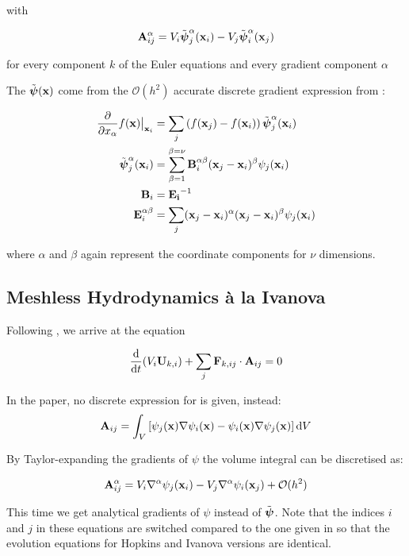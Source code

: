 with

\begin{equation}
	\mathbf{A}_{ij}^\alpha = V_i \tilde{\boldsymbol{\psi}}_j^\alpha (\mathbf{x}_i) - V_j\tilde{\boldsymbol{\psi}}_i^\alpha (\mathbf{x}_j) 			\label{Hopkins}
\end{equation}

for every component $k$ of the Euler equations and every gradient component $\alpha$

The $\tilde{\boldsymbol{\psi}}(\mathbf{x})$ come from the $\mathcal{O}(h^2)$ accurate discrete gradient expression from \cite{lansonRenormalizedMeshfreeSchemes2008}:

\begin{align}
	\frac{\del}{\del x_{\alpha}} f(\x) \big{|}_{\x_i} &= 
	\sum_j \left( f(\x_j) - f(\x_i) \right) \psitilde_j^\alpha (\x_i) 	\\		\label{gradient}
	\psitilde_j^\alpha (\x_i) &= \sum_{\beta = 1}^{\beta=\nu} \mathbf{B}_i^{\alpha \beta} 
	(\x_j - \x_i)^\beta \psi_j(\x_i) 	\\
	\mathbf{B}_i &= \mathbf{E_i} ^ {-1} \\ 
	\mathbf{E}_i^{\alpha \beta} &= \sum_j (\x_j - \x_i)^\alpha (\x_j - \x_i)^\beta \psi_j(\x_i)
\end{align}



where $\alpha$ and $\beta$ again represent the coordinate components for $\nu$ dimensions.












\subsection{Meshless Hydrodynamics \`a la Ivanova}



Following \cite{ivanovaCommonEnvelopeEvolution2013}, we arrive at the equation

\begin{equation}
    \frac{\D}{\D t} (V_i \U_{k,i}) + \sum_j \F_{k,ij} \cdot \Aijm = 0
\end{equation}


In the paper, no discrete expression for \Aij is given, instead:
\begin{equation}
    \mathbf{A}_{ij} = \int_V \left[ \psi_j(\mathbf{x}) \nabla \psi_i(\mathbf{x}) - \psi_i(\mathbf{x}) \nabla \psi_j(\mathbf{x}) \right] \mathrm{d} V
\end{equation}


By Taylor-expanding the gradients of $\psi$ the volume integral can be discretised as:

\begin{equation}
    \mathbf{A}_{ij}^\alpha = V_i \nabla^\alpha  \psi_j (\mathbf{x}_i) - V_j \nabla^\alpha  \psi_i (\mathbf{x}_j)	+ \mathcal{O}(h^2)	\label{Ivanova}
\end{equation}

This time we get analytical gradients of $\psi$ instead of $\tilde{\boldsymbol{\psi}}$.
Note that the indices $i$ and $j$ in these equations are switched compared to the one given in \cite{ivanovaCommonEnvelopeEvolution2013} so that the evolution equations for Hopkins and Ivanova versions are identical.
